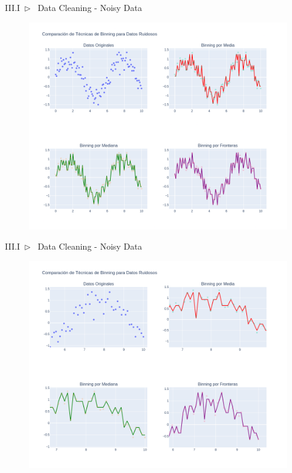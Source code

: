 \documentclass[xcolor=dvipsnames]{beamer}
\begin{document}
    \begin{frame}{III.I~$\rhd$~ Data Cleaning - Noisy Data}
        \begin{figure}
            \centering
            \includegraphics[width=0.8\linewidth]{imgs/noise/ej1.png}
        \end{figure}
    \end{frame}

    \begin{frame}{III.I~$\rhd$~ Data Cleaning - Noisy Data}
        \begin{figure}
            \centering
            \includegraphics[width=0.8\linewidth]{imgs/noise/ej2.png}
        \end{figure}
    \end{frame}
\end{document}
